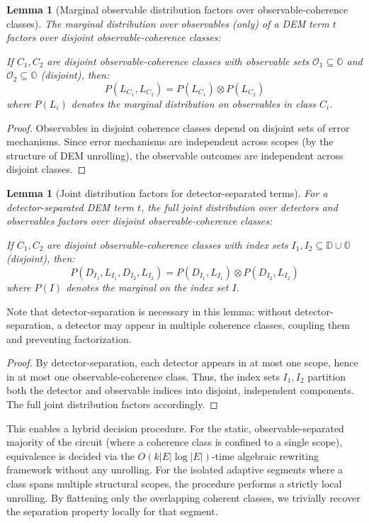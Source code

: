 \documentclass[11pt,a4paper]{article}
\newtheorem{lemma}[theorem]{Lemma}
\begin{document}
\begin{lemma}[Marginal observable distribution factors over observable-coherence classes]
\label{lem:marginal-factorization}
The \emph{marginal distribution over observables (only)} of a DEM term $t$ factors over disjoint observable-coherence classes:

If $C_1, C_2$ are disjoint observable-coherence classes with observable sets $\mathcal{O}_1 \subseteq \mathbb{O}$ and $\mathcal{O}_2 \subseteq \mathbb{O}$ (disjoint), then:
\[
  P(L_{C_1}, L_{C_2}) = P(L_{C_1}) \otimes P(L_{C_2})
\]
where $P(L_i)$ denotes the marginal distribution on observables in class $C_i$.
\end{lemma}

\begin{proof}
Observables in disjoint coherence classes depend on disjoint sets of error mechanisms. Since error mechanisms are independent across scopes (by the structure of DEM unrolling), the observable outcomes are independent across disjoint classes.
\end{proof}

\begin{lemma}[Joint distribution factors for detector-separated terms]
\label{lem:joint-factorization}
For a detector-separated DEM term $t$, the \emph{full joint distribution over detectors and observables} factors over disjoint observable-coherence classes:

If $C_1, C_2$ are disjoint observable-coherence classes with index sets $I_1, I_2 \subseteq \mathbb{D} \cup \mathbb{O}$ (disjoint), then:
\[
  P(D_{I_1}, L_{I_1}, D_{I_2}, L_{I_2}) = P(D_{I_1}, L_{I_1}) \otimes P(D_{I_2}, L_{I_2})
\]
where $P(I)$ denotes the marginal on the index set $I$.
\end{lemma}

Note that detector-separation is necessary in this lemma: without detector-separation, a detector may appear in multiple coherence classes, coupling them and preventing factorization.

\begin{proof}
By detector-separation, each detector appears in at most one scope, hence in at most one observable-coherence class. Thus, the index sets $I_1, I_2$ partition both the detector and observable indices into disjoint, independent components. The full joint distribution factors accordingly.
\end{proof}

This enables a hybrid decision procedure. For the static, observable-separated majority of the circuit (where a coherence class is confined to a single scope), equivalence is decided via the $O(k|E|\log|E|)$-time algebraic rewriting framework without any unrolling. For the isolated adaptive segments where a class spans multiple structural scopes, the procedure performs a strictly local unrolling. By flattening only the overlapping coherent classes, we trivially recover the separation property locally for that segment.
\end{document}
